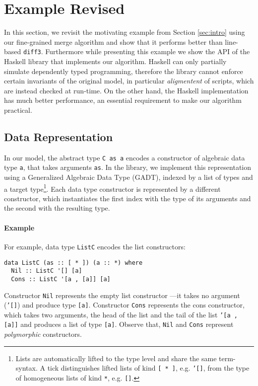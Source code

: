 \documentclass{sigplanconf}
\theoremstyle{plain}
\begin{document}
\section{Example Revised}
\label{sec:haskell}
In this section, we revisit the motivating example from Section
\ref{sec:intro} using our fine-grained merge algorithm and show that
it performs better than line-based \texttt{diff3}.
%
Furthermore while presenting this example we show the API of the
Haskell library that implements our algorithm.
%
Haskell can only partially simulate dependently typed programming,
therefore the library cannot enforce certain invariants of the
original model, in particular \emph{aligmentent} of scripts, which are
instead checked at run-time.
%
On the other hand, the Haskell implementation has much better
performance, an essential requirement to make our algorithm practical.
%

\subsection{Data  Representation}
In our model, the abstract type \texttt{C as a} encodes a constructor
of algebraic data type \texttt{a}, that takes arguments \texttt{as}.
%
In the library, we implement this representation using
a Generalized Algebraic Data Type (GADT), indexed by a list of types
and a target type\footnote{Lists are automatically lifted to the type
  level and share the same term-syntax. A tick distinguishes lifted
  lists of kind \texttt{[ * ]}, e.g. \texttt{'[]}, from the type of
  homogeneous lists of kind \texttt{*}, e.g. \texttt{[]}.}.
%
Each data type constructor is represented by a different constructor,
which instantiates the first index with the type of its arguments and
the second with the resulting type.
%
\paragraph{Example}
For example, data type \texttt{ListC} encodes the list constructors:
\begin{verbatim}
data ListC (as :: [ * ]) (a :: *) where
  Nil :: ListC '[] [a]
  Cons :: ListC '[a , [a]] [a]
\end{verbatim}
Constructor \texttt{Nil} represents the empty list constructor ---it
takes no argument (\texttt{'[]}) and produce type \texttt{[a]}.
Constructor \texttt{Cons} represents the cons constructor, which
takes two arguments, the head of the list and the tail of the list
\texttt{'[a , [a]]} and produces a list of type \texttt{[a]}.
%
Observe that, \texttt{Nil} and \texttt{Cons} represent \emph{polymorphic}
constructors.
%
\end{document}
